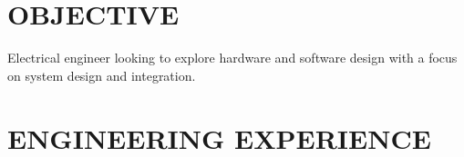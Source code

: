 \documentclass[line,margin]{res}
\begin{document}
\address{8434 Via Sonoma, \#63, La Jolla, CA 92037}
\address{nthui@eng.ucsd.edu, (408) 780-8594}


\begin{resume}

\section{OBJECTIVE}
	Electrical engineer looking to explore hardware and software design with a focus on system design and integration.


\section{ENGINEERING EXPERIENCE}


\end{resume}
\end{document}
